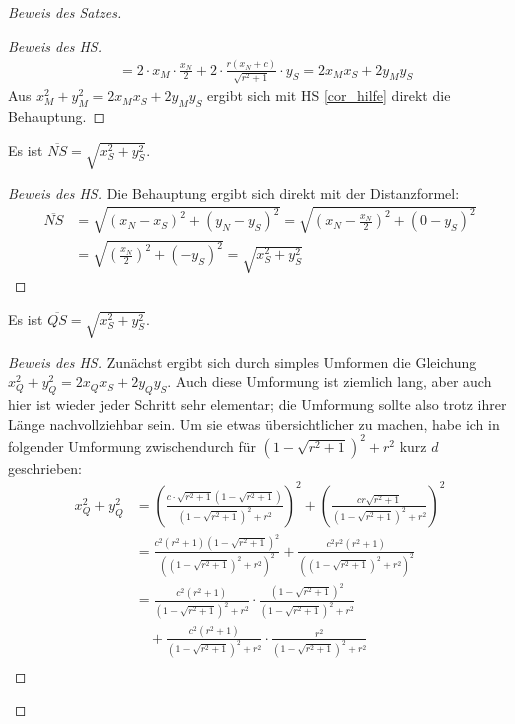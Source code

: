 \begin{proof}[Beweis des Satzes]
\begin{proof}[Beweis des HS]
\begin{align*}
            &=2\cdot x_M\cdot\frac{x_N}{2}+2\cdot\frac{r(x_N+c)}{\sqrt{r^2+1}}\cdot y_S=2x_Mx_S+2y_My_S
        \end{align*}
        Aus $x_M^2+y_M^2=2x_Mx_S+2y_My_S$ ergibt sich mit HS \ref{cor_hilfe} direkt die Behauptung.
    \end{proof}
    \begin{lem}\label{dumm_N}
        Es ist $\overline{NS}=\sqrt{x_S^2+y_S^2}$.
    \end{lem}
    \begin{proof}[Beweis des HS]
        Die Behauptung ergibt sich direkt mit der Distanzformel:
        \begin{align*}
            \overline{NS}&=\sqrt{(x_N-x_S)^2+(y_N-y_S)^2}=\sqrt{\left(x_N-\frac{x_N}{2}\right)^2+(0-y_S)^2}\\
            &=\sqrt{\left(\frac{x_N}{2}\right)^2+(-y_S)^2}=\sqrt{x_S^2+y_S^2}
        \end{align*}
    \end{proof}
    \begin{lem}\label{dumm_Q}
        Es ist $\overline{QS}=\sqrt{x_S^2+y_S^2}$.
    \end{lem}
    \begin{proof}[Beweis des HS]
        Zunächst ergibt sich durch simples Umformen die Gleichung $x_Q^2+y_Q^2=2x_Qx_S+2y_Qy_S$. Auch diese 
        Umformung ist ziemlich lang, aber auch hier ist wieder jeder Schritt sehr elementar; die Umformung sollte 
        also trotz ihrer Länge nachvollziehbar sein. Um sie etwas übersichtlicher zu machen, habe ich in folgender 
        Umformung zwischendurch für $\left(1-\sqrt{r^2+1}\right)^2+r^2$ kurz $d$ geschrieben:
        \begin{align*}
            x_Q^2+y_Q^2&= \left(\frac{c\cdot\sqrt{r^2+1}\left(1-\sqrt{r^2+1}\right)}
            {\left(1-\sqrt{r^2+1}\right)^2+r^2}\right)^2+\left(\frac{cr\sqrt{r^2+1}}{\left(1-\sqrt{r^2+1}\right)^2
            +r^2}\right)^2\\
            &=\frac{c^2(r^2+1)\left(1-\sqrt{r^2+1}\right)^2}{\left(\left(1-\sqrt{r^2+1}\right)^2+r^2\right)^2}+
            \frac{c^2r^2(r^2+1)}{\left(\left(1-\sqrt{r^2+1}\right)^2+r^2\right)^2}\\
            &=\frac{c^2(r^2+1)}{\left(1-\sqrt{r^2+1}\right)^2+r^2}\cdot\frac{\left(1-\sqrt{r^2+1}\right)^2}
            {\left(1-\sqrt{r^2+1}\right)^2+r^2}\\
            &\quad+\frac{c^2(r^2+1)}{\left(1-\sqrt{r^2+1}\right)^2+r^2}\cdot
            \frac{r^2}{\left(1-\sqrt{r^2+1}\right)^2+r^2}\\

\end{align*}
\end{proof}
\end{proof}
